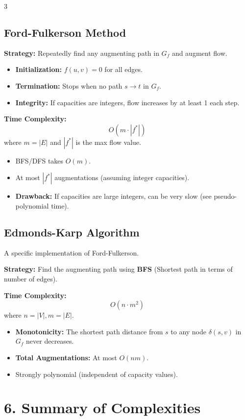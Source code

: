 \documentclass[10pt, a4paper]{article}
\theoremstyle{compact}
\begin{document}
\begin{multicols}{3}
\subsection{Ford-Fulkerson Method}
\textbf{Strategy:} Repeatedly find any augmenting path in $G_f$ and augment flow.

\begin{itemize}
    \item \textbf{Initialization:} $f(u,v) = 0$ for all edges.
    \item \textbf{Termination:} Stops when no path $s \to t$ in $G_f$.
    \item \textbf{Integrity:} If capacities are integers, flow increases by at least 1 each step.
\end{itemize}

\textbf{Time Complexity:}
$$O(m \cdot |f^*|)$$
where $m = |E|$ and $|f^*|$ is the max flow value.
\begin{itemize}
    \item BFS/DFS takes $O(m)$.
    \item At most $|f^*|$ augmentations (assuming integer capacities).
    \item \textbf{Drawback:} If capacities are large integers, can be very slow (see pseudo-polynomial time).
\end{itemize}

\subsection{Edmonds-Karp Algorithm}
A specific implementation of Ford-Fulkerson.

\textbf{Strategy:} Find the augmenting path using \textbf{BFS} (Shortest path in terms of number of edges).

\textbf{Time Complexity:}
$$O(n \cdot m^2)$$
where $n = |V|, m = |E|$.
\begin{itemize}
    \item \textbf{Monotonicity:} The shortest path distance from $s$ to any node $\delta(s,v)$ in $G_f$ never decreases.
    \item \textbf{Total Augmentations:} At most $O(nm)$.
    \item Strongly polynomial (independent of capacity values).
\end{itemize}

\section{6. Summary of Complexities}


\end{multicols}
\end{document}
